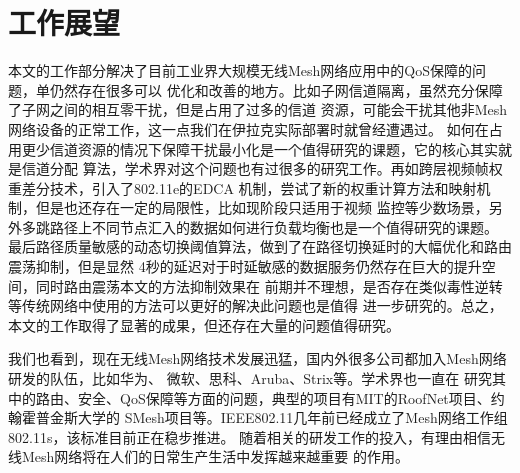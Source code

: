 \section{工作展望}
本文的工作部分解决了目前工业界大规模无线Mesh网络应用中的QoS保障的问题，单仍然存在很多可以
优化和改善的地方。比如子网信道隔离，虽然充分保障了子网之间的相互零干扰，但是占用了过多的信道
资源，可能会干扰其他非Mesh网络设备的正常工作，这一点我们在伊拉克实际部署时就曾经遭遇过。
如何在占用更少信道资源的情况下保障干扰最小化是一个值得研究的课题，它的核心其实就是信道分配
算法，学术界对这个问题也有过很多的研究工作。再如跨层视频帧权重差分技术，引入了802.11e的EDCA
机制，尝试了新的权重计算方法和映射机制，但是也还存在一定的局限性，比如现阶段只适用于视频
监控等少数场景，另外多跳路径上不同节点汇入的数据如何进行负载均衡也是一个值得研究的课题。
最后路径质量敏感的动态切换阈值算法，做到了在路径切换延时的大幅优化和路由震荡抑制，但是显然
4秒的延迟对于时延敏感的数据服务仍然存在巨大的提升空间，同时路由震荡本文的方法抑制效果在
前期并不理想，是否存在类似毒性逆转等传统网络中使用的方法可以更好的解决此问题也是值得
进一步研究的。总之，本文的工作取得了显著的成果，但还存在大量的问题值得研究。

我们也看到，现在无线Mesh网络技术发展迅猛，国内外很多公司都加入Mesh网络研发的队伍，比如华为、
微软、思科、Aruba、Strix等。学术界也一直在
研究其中的路由、安全、QoS保障等方面的问题，典型的项目有MIT的RoofNet项目、约翰霍普金斯大学的
SMesh项目等。IEEE802.11几年前已经成立了Mesh网络工作组802.11s，该标准目前正在稳步推进。
随着相关的研发工作的投入，有理由相信无线Mesh网络将在人们的日常生产生活中发挥越来越重要
的作用。

